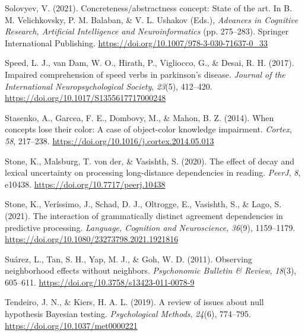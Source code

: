 \documentclass[
  12pt,
  man,floatsintext]{apa7}
\newlength{\cslhangindent}
\newlength{\cslentryspacingunit} %
\newenvironment{CSLReferences}[2] %
 {%
  \setlength{\parindent}{0pt}
  \ifodd #1
  \let\oldpar\par
  \def\par{\hangindent=\cslhangindent\oldpar}
  \fi
  \setlength{\parskip}{#2\cslentryspacingunit}
 }%
 {}
\begin{document}
\begin{CSLReferences}{1}{0}
\leavevmode{}%
Solovyev, V. (2021). Concreteness/abstractness concept: State of the art. In B. M. Velichkovsky, P. M. Balaban, \& V. L. Ushakov (Eds.), \emph{Advances in {Cognitive Research}, {Artificial Intelligence} and {Neuroinformatics}} (pp. 275--283). {Springer International Publishing}. \url{https://doi.org/10.1007/978-3-030-71637-0_33}

\leavevmode{}%
Speed, L. J., van Dam, W. O., Hirath, P., Vigliocco, G., \& Desai, R. H. (2017). Impaired comprehension of speed verbs in parkinson's disease. \emph{Journal of the International Neuropsychological Society}, \emph{23}(5), 412--420. \url{https://doi.org/10.1017/S1355617717000248}

\leavevmode{}%
Stasenko, A., Garcea, F. E., Dombovy, M., \& Mahon, B. Z. (2014). When concepts lose their color: {A} case of object-color knowledge impairment. \emph{Cortex}, \emph{58}, 217--238. \url{https://doi.org/10.1016/j.cortex.2014.05.013}

\leavevmode{}%
Stone, K., Malsburg, T. von der, \& Vasishth, S. (2020). The effect of decay and lexical uncertainty on processing long-distance dependencies in reading. \emph{PeerJ}, \emph{8}, e10438. \url{https://doi.org/10.7717/peerj.10438}

\leavevmode{}%
Stone, K., Veríssimo, J., Schad, D. J., Oltrogge, E., Vasishth, S., \& Lago, S. (2021). The interaction of grammatically distinct agreement dependencies in predictive processing. \emph{Language, Cognition and Neuroscience}, \emph{36}(9), 1159--1179. \url{https://doi.org/10.1080/23273798.2021.1921816}

\leavevmode{}%
Suárez, L., Tan, S. H., Yap, M. J., \& Goh, W. D. (2011). Observing neighborhood effects without neighbors. \emph{Psychonomic Bulletin \& Review}, \emph{18}(3), 605--611. \url{https://doi.org/10.3758/s13423-011-0078-9}

\leavevmode{}%
Tendeiro, J. N., \& Kiers, H. A. L. (2019). A review of issues about null hypothesis {Bayesian} testing. \emph{Psychological Methods}, \emph{24}(6), 774--795. \url{https://doi.org/10.1037/met0000221}


\end{CSLReferences}
\end{document}
